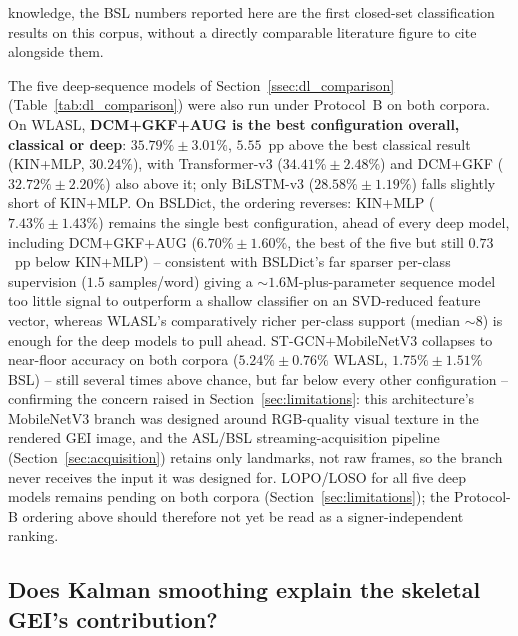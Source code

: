 \documentclass[journal]{IEEEtran}
\begin{document}
knowledge, the BSL numbers reported here are the first closed-set classification results on this corpus, without a directly comparable literature figure to cite alongside them.

The five deep-sequence models of Section~\ref{ssec:dl_comparison} (Table~\ref{tab:dl_comparison}) were also run under Protocol~B on both corpora. On WLASL, \textbf{DCM+GKF+AUG is the best configuration overall, classical or deep}: $35.79\%\pm3.01\%$, $5.55$~pp above the best classical result (KIN+MLP, $30.24\%$), with Transformer-v3 ($34.41\%\pm2.48\%$) and DCM+GKF ($32.72\%\pm2.20\%$) also above it; only BiLSTM-v3 ($28.58\%\pm1.19\%$) falls slightly short of KIN+MLP. On BSLDict, the ordering reverses: KIN+MLP ($7.43\%\pm1.43\%$) remains the single best configuration, ahead of every deep model, including DCM+GKF+AUG ($6.70\%\pm1.60\%$, the best of the five but still $0.73$~pp below KIN+MLP) -- consistent with BSLDict's far sparser per-class supervision ($1.5$ samples/word) giving a $\sim$$1.6$M-plus-parameter sequence model too little signal to outperform a shallow classifier on an SVD-reduced feature vector, whereas WLASL's comparatively richer per-class support (median $\sim$$8$) is enough for the deep models to pull ahead. ST-GCN+MobileNetV3 collapses to near-floor accuracy on both corpora ($5.24\%\pm0.76\%$ WLASL, $1.75\%\pm1.51\%$ BSL) -- still several times above chance, but far below every other configuration -- confirming the concern raised in Section~\ref{sec:limitations}: this architecture's MobileNetV3 branch was designed around RGB-quality visual texture in the rendered GEI image, and the ASL/BSL streaming-acquisition pipeline (Section~\ref{sec:acquisition}) retains only landmarks, not raw frames, so the branch never receives the input it was designed for. LOPO/LOSO for all five deep models remains pending on both corpora (Section~\ref{sec:limitations}); the Protocol-B ordering above should therefore not yet be read as a signer-independent ranking.

\subsection{Does Kalman smoothing explain the skeletal GEI's contribution?}
\label{ssec:kalman_ablation}
\end{document}
